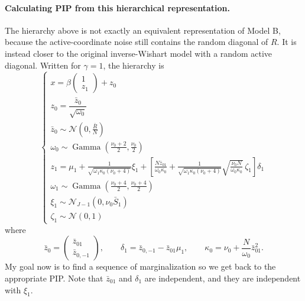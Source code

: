 \documentclass[11pt]{article}
\newcommand{\Gam}{\operatorname{Gamma}}
\newcommand{\Normal}{\mathcal N}
\begin{document}
\paragraph{Calculating PIP from this hierarchical representation.} The hierarchy above is not exactly an equivalent representation of Model B, because the active-coordinate noise still contains the random diagonal of $R$. It is instead closer to the original inverse-Wishart model with a random active diagonal. Written for $\gamma=1$, the hierarchy is
\begin{equation}\label{eq:almost-equivalent-B}
\begin{cases}
x = \beta \begin{pmatrix} 1 \\ z_1\end{pmatrix} + z_0\\
z_0 = \dfrac{\bar z_0}{\sqrt{\omega_0}}\\
\bar z_0 \sim \Normal\left(0,\frac{\bar R}{N}\right)\\
\omega_0 \sim \Gam\left(\frac{\nu_0 + 2}{2},\frac{\nu_0}{2}\right)\\
z_1 = \mu_1 +\frac{1}{\sqrt{\omega_1\kappa_0(\nu_0+4)}}\xi_1 +\left[
\frac{N\bar z_{01}}{\omega_0\kappa_0}
+\frac{1}{\sqrt{\omega_1\kappa_0(\nu_0+4)}}
\sqrt{\frac{\nu_0 N}{\omega_0\kappa_0}}\,\zeta_1\right]\delta_1 \\
\omega_1\sim\Gam\left(\frac{\nu_0+4}{2},\frac{\nu_0+4}{2}\right)\\
\xi_1\sim\Normal_{J-1}(0,\nu_0\bar S_1)\\
\zeta_1\sim\Normal(0,1)
\end{cases}
\end{equation}
where
\[
\bar z_0=
\begin{pmatrix}
\bar z_{01}\\ \bar z_{0,-1}
\end{pmatrix},
\qquad
\delta_1=\bar z_{0,-1}-\bar z_{01}\mu_1,
\qquad
\kappa_0=\nu_0+\frac{N}{\omega_0}\bar z_{01}^2.
\]
My goal now is to find a sequence of marginalization so we get back to the appropriate PIP.  Note that $\bar z_{01}$ and $\delta_1$ are independent, and they are independent with $\xi_1$.
\end{document}
